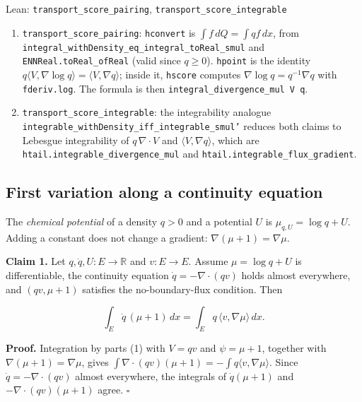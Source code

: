 \documentclass[11pt,a4paper]{report}
\begin{document}
\begin{leanbox}{Lean: \texttt{transport\_\allowbreak{}score\_\allowbreak{}pairing}, \texttt{transport\_\allowbreak{}score\_\allowbreak{}integrable}}
\begin{enumerate}


\item \texttt{transport\_\allowbreak{}score\_\allowbreak{}pairing}: \texttt{hconvert} is \(\int f\,dQ=\int qf\,dx\), from \texttt{integral\_\allowbreak{}with\allowbreak{}Density\_\allowbreak{}eq\_\allowbreak{}integral\_\allowbreak{}to\allowbreak{}Real\_\allowbreak{}smul} and \texttt{ENNReal.\allowbreak{}to\allowbreak{}Real\_\allowbreak{}of\allowbreak{}Real} (valid since \(q\ge0\)). \texttt{hpoint} is the identity \(q\langle V,\nabla\log q\rangle=\langle V,\nabla q\rangle\); inside it, \texttt{hscore} computes \(\nabla\log q=q^{-1}\nabla q\) with \texttt{fderiv.\allowbreak{}log}. The formula is then \texttt{integral\_\allowbreak{}divergence\_\allowbreak{}mul V q}.

\item \texttt{transport\_\allowbreak{}score\_\allowbreak{}integrable}: the integrability analogue \texttt{integrable\_\allowbreak{}with\allowbreak{}Density\_\allowbreak{}iff\_\allowbreak{}integrable\_\allowbreak{}smul'} reduces both claims to Lebesgue integrability of \(q\,\nabla\cdot V\) and \(\langle V,\nabla q\rangle\), which are \texttt{htail.\allowbreak{}integrable\_\allowbreak{}divergence\_\allowbreak{}mul} and \texttt{htail.\allowbreak{}integrable\_\allowbreak{}flux\_\allowbreak{}gradient}.

\end{enumerate}
\end{leanbox}
\subsection{\texorpdfstring{First variation along a continuity equation}{First variation along a continuity equation}}


The \emph{chemical potential} of a density \(q>0\) and a potential \(U\) is \(\mu_{q,U}=\log q+U\). Adding a constant does not change a gradient: \(\nabla(\mu+1)=\nabla\mu\).




\textbf{Claim 1.} Let \(q,\dot q,U:E\to\mathbb R\) and \(v:E\to E\). Assume \(\mu=\log q+U\) is differentiable, the continuity equation \(\dot q=-\nabla\cdot(qv)\) holds almost everywhere, and \((qv,\mu+1)\) satisfies the no-boundary-flux condition. Then


\[\int_E\dot q\,(\mu+1)\,dx=\int_Eq\,\langle v,\nabla\mu\rangle\,dx.\]


\textbf{Proof.} Integration by parts (1) with \(V=qv\) and \(\psi=\mu+1\), together with \(\nabla(\mu+1)=\nabla\mu\), gives \(\int\nabla\cdot(qv)(\mu+1)=-\int q\langle v,\nabla\mu\rangle\). Since \(\dot q=-\nabla\cdot(qv)\) almost everywhere, the integrals of \(\dot q(\mu+1)\) and \(-\nabla\cdot(qv)(\mu+1)\) agree. \(\square\)
\end{document}
